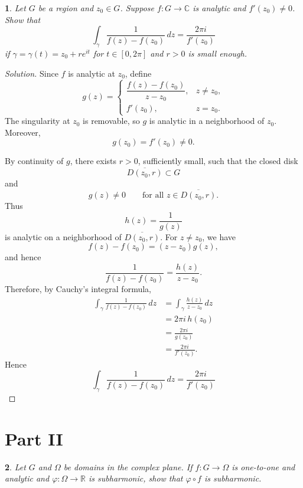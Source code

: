 \documentclass[12pt, a4paper]{report}
\theoremstyle{spaced}
\newtheorem{exercise}{}
\begin{document}
\begin{exercise}
	Let \(G\) be a region and \(z_0\in G\). Suppose \(f:G\to\mathbb{C}\) is
	analytic and \(f'(z_0)\neq 0\). Show that
	\[
		\int_\gamma \frac{1}{f(z)-f(z_0)}\,dz=\frac{2\pi i}{f'(z_0)}
	\]
	if \(\gamma=\gamma(t)=z_0+re^{it}\) for \(t\in[0,2\pi]\) and \(r>0\) is small
	enough.
\end{exercise}
\begin{proof}[Solution]
	Since \(f\) is analytic at \(z_0\), define
	\[
		g(z)=
		\begin{cases}
			\dfrac{f(z)-f(z_0)}{z-z_0}, & z\neq z_0, \\[1.2ex]
			f'(z_0),                    & z=z_0.
		\end{cases}
	\]
	The singularity at \(z_0\) is removable, so \(g\) is analytic in a
	neighborhood of \(z_0\). Moreover,
	\[
		g(z_0)=f'(z_0)\neq 0.
	\]

	By continuity of \(g\), there exists \(r>0\), sufficiently small, such
	that the closed disk
	\[
		\overline{D(z_0,r)}\subset G
	\]
	and
	\[
		g(z)\neq 0
		\qquad\text{for all }z\in \overline{D(z_0,r)}.
	\]
	Thus
	\[
		h(z)=\frac{1}{g(z)}
	\]
	is analytic on a neighborhood of \(\overline{D(z_0,r)}\).
	For \(z\neq z_0\), we have
	\[
		f(z)-f(z_0)=(z-z_0)g(z),
	\]
	and hence
	\[
		\frac{1}{f(z)-f(z_0)}
		=
		\frac{h(z)}{z-z_0}.
	\]
	Therefore, by Cauchy's integral formula,
	\[
		\begin{aligned}
			\int_\gamma \frac{1}{f(z)-f(z_0)}\,dz
			 & =
			\int_\gamma \frac{h(z)}{z-z_0}\,dz \\
			 & =
			2\pi i\,h(z_0)                     \\
			 & =
			\frac{2\pi i}{g(z_0)}              \\
			 & =
			\frac{2\pi i}{f'(z_0)}.
		\end{aligned}
	\]
	Hence
	\[
		\int_\gamma \frac{1}{f(z)-f(z_0)}\,dz
		=
		\frac{2\pi i}{f'(z_0)}
	\]
\end{proof}

\section{Part II}
\begin{exercise}
	Let \(G\) and \(\Omega\) be domains in the complex plane. If
	\(f:G\to\Omega\) is one-to-one and analytic and
	\(\varphi:\Omega\to\mathbb{R}\) is subharmonic, show that
	\(\varphi\circ f\) is subharmonic.
\end{exercise}
\end{document}
